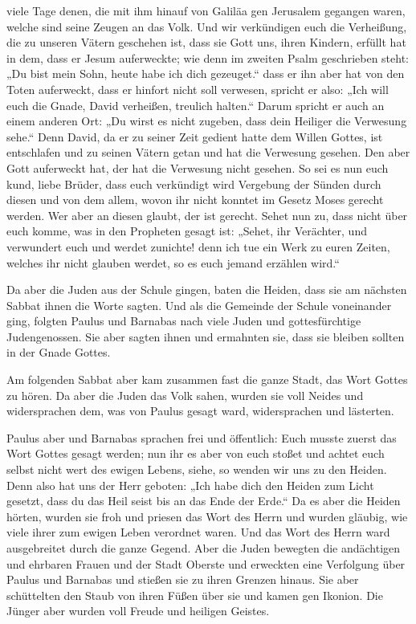 viele Tage denen, die mit ihm hinauf von Galiläa gen Jerusalem gegangen
waren, welche sind seine Zeugen an das Volk.  Und wir
verkündigen euch die Verheißung, die zu unseren Vätern geschehen ist,
 dass sie Gott uns, ihren Kindern, erfüllt hat in dem,
dass er Jesum auferweckte; wie denn im zweiten Psalm geschrieben steht:
„Du bist mein Sohn, heute habe ich dich gezeuget.``  dass
er ihn aber hat von den Toten auferweckt, dass er hinfort nicht soll
verwesen, spricht er also: „Ich will euch die Gnade, David verheißen,
treulich halten.``  Darum spricht er auch an einem
anderen Ort: „Du wirst es nicht zugeben, dass dein Heiliger die
Verwesung sehe.``  Denn David, da er zu seiner Zeit
gedient hatte dem Willen Gottes, ist entschlafen und zu seinen Vätern
getan und hat die Verwesung gesehen.  Den aber Gott
auferweckt hat, der hat die Verwesung nicht gesehen.  So
sei es nun euch kund, liebe Brüder, dass euch verkündigt wird Vergebung
der Sünden durch diesen und von dem allem, wovon ihr nicht konntet im
Gesetz Moses gerecht werden.  Wer aber an diesen glaubt,
der ist gerecht.  Sehet nun zu, dass nicht über euch
komme, was in den Propheten gesagt ist:  „Sehet, ihr
Verächter, und verwundert euch und werdet zunichte! denn ich tue ein
Werk zu euren Zeiten, welches ihr nicht glauben werdet, so es euch
jemand erzählen wird.``

 Da aber die Juden aus der Schule gingen, baten die
Heiden, dass sie am nächsten Sabbat ihnen die Worte sagten.
 Und als die Gemeinde der Schule voneinander ging,
folgten Paulus und Barnabas nach viele Juden und gottesfürchtige
Judengenossen. Sie aber sagten ihnen und ermahnten sie, dass sie bleiben
sollten in der Gnade Gottes.

 Am folgenden Sabbat aber kam zusammen fast die ganze
Stadt, das Wort Gottes zu hören.  Da aber die Juden das
Volk sahen, wurden sie voll Neides und widersprachen dem, was von Paulus
gesagt ward, widersprachen und lästerten.

 Paulus aber und Barnabas sprachen frei und öffentlich:
Euch musste zuerst das Wort Gottes gesagt werden; nun ihr es aber von
euch stoßet und achtet euch selbst nicht wert des ewigen Lebens, siehe,
so wenden wir uns zu den Heiden.  Denn also hat uns der
Herr geboten: „Ich habe dich den Heiden zum Licht gesetzt, dass du das
Heil seist bis an das Ende der Erde.``  Da es aber die
Heiden hörten, wurden sie froh und priesen das Wort des Herrn und wurden
gläubig, wie viele ihrer zum ewigen Leben verordnet waren.
 Und das Wort des Herrn ward ausgebreitet durch die ganze
Gegend.  Aber die Juden bewegten die andächtigen und
ehrbaren Frauen und der Stadt Oberste und erweckten eine Verfolgung über
Paulus und Barnabas und stießen sie zu ihren Grenzen hinaus.
 Sie aber schüttelten den Staub von ihren Füßen über sie
und kamen gen Ikonion.  Die Jünger aber wurden voll
Freude und heiligen Geistes.

